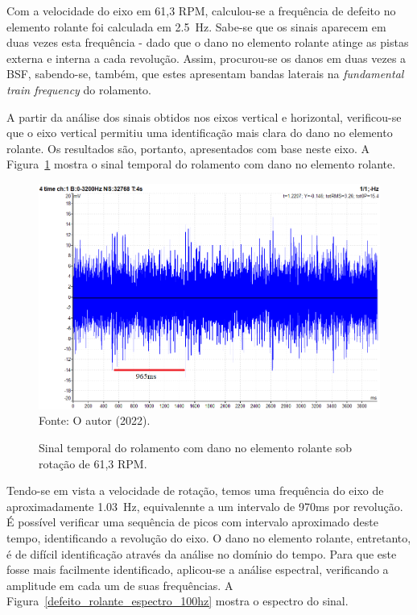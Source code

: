 \documentclass[
	12pt,				
	oneside,			
	a4paper,			
	english,			
	brazil,			
	]{abntex2ppgsi}
\begin{document}
Com a velocidade do eixo em 61,3 RPM, calculou-se a frequência de defeito no elemento rolante foi calculada em \SI{2,5}{\hertz}. Sabe-se que os sinais aparecem em duas vezes esta frequência - dado que o dano no elemento rolante atinge as pistas externa e interna a cada revolução. Assim, procurou-se os danos em duas vezes a BSF, sabendo-se, também, que estes apresentam bandas laterais na \textit{fundamental train frequency} do rolamento. 

A partir da análise dos sinais obtidos nos eixos vertical e horizontal, verificou-se que o eixo vertical permitiu uma identificação mais clara do dano no elemento rolante. Os resultados são, portanto, apresentados com base neste eixo. A Figura~\ref{dominio_tempo_defeito_rolante_acelerometro_100hz_anotado} mostra o sinal temporal do rolamento com dano no elemento rolante.

\begin{figure}[H]
\centering
\caption {Sinal temporal do rolamento com dano no elemento rolante sob rotação de 61,3 RPM.}
\includegraphics[width=\textwidth,keepaspectratio]{dominio_tempo_defeito_rolante_acelerometro_100hz_anotado} \\
Fonte: O autor (2022).
\label{dominio_tempo_defeito_rolante_acelerometro_100hz_anotado}
\end{figure}

Tendo-se em vista a velocidade de rotação, temos uma frequência do eixo de aproximadamente \SI{1,03}{\hertz}, equivalennte a um intervalo de 970ms por revolução. É possível verificar uma sequência de picos com intervalo aproximado deste tempo, identificando a revolução do eixo. O dano no elemento rolante, entretanto, é de difícil identificação através da análise no domínio do tempo. Para que este fosse mais facilmente identificado, aplicou-se a análise espectral, verificando a amplitude em cada um de suas frequências. A Figura~\ref{defeito_rolante_espectro_100hz} mostra o espectro do sinal. 
\end{document}
